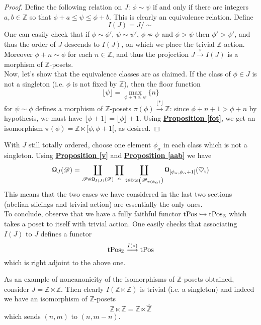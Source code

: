\begin{proof}
Define the following relation on $J$: $\phi \sim \psi$ if and only if there are integers $a,b \in \mathbb{Z}$ so that $\phi + a \le \psi \le \phi + b $. This is clearly an equivalence relation. Define $$I(J)=J / \sim$$ 
One can easily check that if $\phi \sim \phi'$, $\psi \sim \psi'$, $\phi \not \sim \psi$ and $\phi > \psi$ then $\phi' > \psi'$, and thus the order of $J$ descends to $I(J)$, on which we place the trivial $\mathbb{Z}$-action. Moreover $\phi + n \sim \phi$ for each $n \in \mathbb{Z}$, and thus the projection $J \overset{\pi}{\longrightarrow} I(J)$ is a morphism of $\mathbb{Z}$-posets. \\
Now, let's show that the equivalence classes are as claimed. If the class of $\phi \in J$ is not a singleton (i.e. $\phi$ is not fixed by $\mathbb{Z}$), then the floor function $$\lfloor \psi \rfloor = \max_{\phi + n \le \psi} \{ n \}$$ 
for $\psi \sim \phi$ defines a morphism of $\mathbb{Z}$-posets $\pi(\phi) \overset{\lfloor * \rfloor}{\longrightarrow} \mathbb{Z}$: since $\phi + n + 1 > \phi + n$ by hypothesis, we must have $\lfloor \phi + 1 \rfloor = \lfloor \phi \rfloor + 1$. Using \hyperref[fot]{\textbf{Proposition \ref*{fot}}}, we get an isomorphism $\pi(\phi)=\mathbb{Z} \ltimes [\phi, \phi +1 [$, as desired. 
\end{proof}

With $J$ still totally ordered, choose one element $\phi_{\alpha}$ in each class which is not a singleton. Using \hyperref[v]{\textbf{Proposition \ref*{v}}} and \hyperref[aab]{\textbf{Proposition \ref*{aab}}} we have $$\textnormal{\Libra}_J(\mathscr{D})=\coprod_{\mathscr{P} \in \textnormal{\Libra}_{I(J)}(\mathscr{D})} \prod_{\alpha} \coprod_{\mathfrak{t} \in \mathfrak{bts}\left( \mathscr{P}_{\pi(\phi_{\alpha})} \right)} \textnormal{\Libra}_{[\phi_{\alpha},\phi_{\alpha}+1 [ }(\heartsuit_{\mathfrak{t}})$$
This means that the two cases we have considered in the last two sections (abelian slicings and trivial action) are essentially the only ones. \\
To conclude, observe that we have a fully faithful functor $\textnormal{tPos} \hookrightarrow \textnormal{tPos}_{\mathbb{Z}}$ which takes a poset to itself with trivial action. One easily checks that associating $I(J)$ to $J$ defines a functor $$\textnormal{tPos}_{\mathbb{Z}} \overset{I(*)}{\longrightarrow} \textnormal{tPos} $$ which is right adjoint to the above one. 

\begin{rem}\label{zet}
  As an example of noncanonicity of the isomorphisms of $\mathbb{Z}$-posets obtained, consider $J=\mathbb{Z} \ltimes \mathbb{Z}$. Then clearly $I(\mathbb{Z} \ltimes \mathbb{Z})$ is trivial (i.e. a singleton) and indeed we have an isomorphism of $\mathbb{Z}$-posets $$\mathbb{Z} \ltimes \mathbb{Z} = \mathbb{Z} \ltimes \hat{\mathbb{Z}}$$ 
which sends $(n,m)$ to $(n,m-n)$.  
\end{rem}
\newpage 


